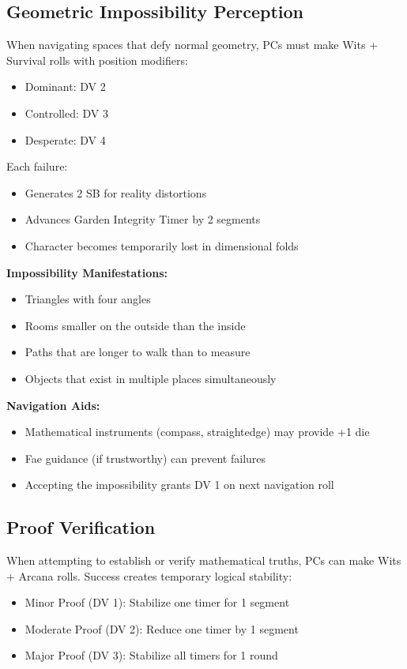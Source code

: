 \documentclass[11pt]{article}
\begin{document}
\subsection{Geometric Impossibility Perception}

When navigating spaces that defy normal geometry, PCs must make Wits + Survival rolls with position modifiers:
\begin{itemize}
\item Dominant: DV 2
\item Controlled: DV 3
\item Desperate: DV 4
\end{itemize}

Each failure:
\begin{itemize}
\item Generates 2 SB for reality distortions
\item Advances Garden Integrity Timer by 2 segments
\item Character becomes temporarily lost in dimensional folds
\end{itemize}

\textbf{Impossibility Manifestations:}
\begin{itemize}
\item Triangles with four angles
\item Rooms smaller on the outside than the inside
\item Paths that are longer to walk than to measure
\item Objects that exist in multiple places simultaneously
\end{itemize}

\textbf{Navigation Aids:}
\begin{itemize}
\item Mathematical instruments (compass, straightedge) may provide +1 die
\item Fae guidance (if trustworthy) can prevent failures
\item Accepting the impossibility grants DV 1 on next navigation roll
\end{itemize}

\subsection{Proof Verification}

When attempting to establish or verify mathematical truths, PCs can make Wits + Arcana rolls. Success creates temporary logical stability:
\begin{itemize}
\item Minor Proof (DV 1): Stabilize one timer for 1 segment
\item Moderate Proof (DV 2): Reduce one timer by 1 segment
\item Major Proof (DV 3): Stabilize all timers for 1 round
\end{itemize}
\end{document}
